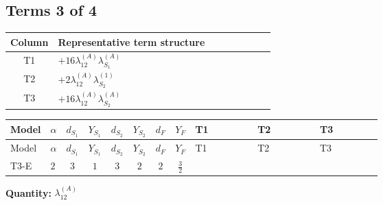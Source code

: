 \documentclass[8pt]{article}
\begin{document}
\begin{landscape}
\subsection*{Terms 3 of 4}
\begin{center}
\begin{tabular}{@{}c >{\raggedright\arraybackslash}p{0.82\linewidth}@{}}
\toprule
Column & Representative term structure \\
\midrule
T1 & \(\displaystyle +16 {\lambda_{12}^{(A)}} {\lambda_{S_1}^{(A)}}\) \\
\midrule
T2 & \(\displaystyle +2 {\lambda_{12}^{(A)}} {\lambda_{S_2}^{(1)}}\) \\
\midrule
T3 & \(\displaystyle +16 {\lambda_{12}^{(A)}} {\lambda_{S_2}^{(A)}}\) \\
\midrule
\bottomrule
\end{tabular}
\end{center}
\smallskip
\tiny
\begin{longtable}{@{}llcccccc >{\raggedright\arraybackslash}p{0.21\linewidth} >{\raggedright\arraybackslash}p{0.21\linewidth} >{\raggedright\arraybackslash}p{0.21\linewidth}@{}}
\toprule
Model & $\alpha$ & $d_{S_1}$ & $Y_{S_1}$ & $d_{S_2}$ & $Y_{S_2}$ & $d_F$ & $Y_F$ & T1 & T2 & T3 \\
\midrule
\endfirsthead
\toprule
Model & $\alpha$ & $d_{S_1}$ & $Y_{S_1}$ & $d_{S_2}$ & $Y_{S_2}$ & $d_F$ & $Y_F$ & T1 & T2 & T3 \\
\midrule
\endhead
T3-E & $2$ & $3$ & $1$ & $3$ & $2$ & $2$ & $\frac{3}{2}$ & \scriptsize\adjustbox{max width=\linewidth}{$\begin{gathered} +16 {\lambda_{12}^{(A)}} {\lambda_{S_1}^{(A)}}\end{gathered}$} & \scriptsize\adjustbox{max width=\linewidth}{$\begin{gathered} +2 {\lambda_{12}^{(A)}} {\lambda_{S_2}^{(1)}}\end{gathered}$} & \scriptsize\adjustbox{max width=\linewidth}{$\begin{gathered} +16 {\lambda_{12}^{(A)}} {\lambda_{S_2}^{(A)}}\end{gathered}$} \\
\midrule
\bottomrule
\end{longtable}
\clearpage
\noindent\textbf{Quantity: }$\lambda_{12}^{(A)}$\par\smallskip

\end{landscape}
\end{document}
